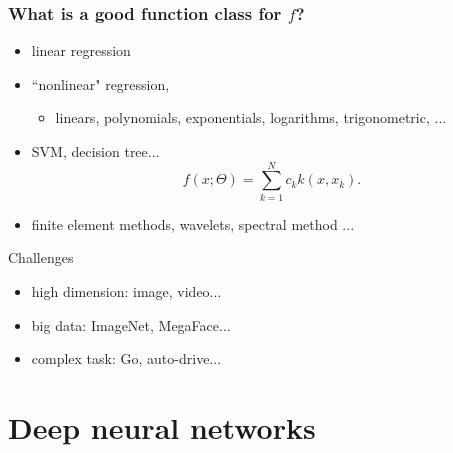 \documentclass{beamer}
\begin{document}
\begin{CJK*}{UTF8}{gbsn}
\begin{frame}
\frametitle{What is a good function class for $f$?}
\begin{small}
\begin{itemize}
\item linear regression 
\item  ``nonlinear" regression, 
\begin{itemize}
\item linears, polynomials, exponentials,  logarithms, trigonometric, ...
\end{itemize}
\pause 
\item SVM, decision tree...
	$$
	f(x;\Theta) = \sum_{k=1}^N c_k k(x,x_k).
	$$
\end{itemize}
\pause 
{}
\begin{itemize}
	\item finite element methods, wavelets, spectral method ...
\end{itemize}
\end{small}
\end{frame}
\begin{frame}
{Challenges}
\begin{itemize}
	\item high dimension: image, video...
	\item big data: ImageNet, MegaFace...
	\item complex task: Go, auto-drive...
\end{itemize}
\end{frame}

\section{Deep neural networks}


\end{CJK*}
\end{document}
